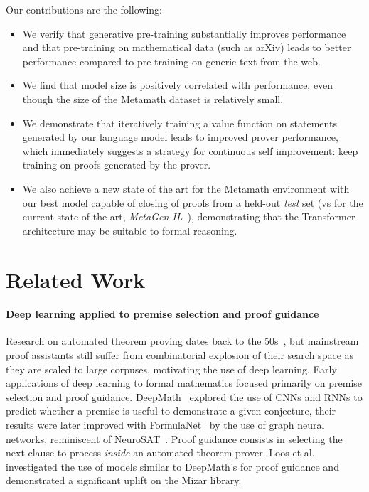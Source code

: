 \documentclass{article}
\begin{document}
Our contributions are the following:
\begin{itemize}

\item We verify that generative pre-training substantially improves performance and that pre-training on mathematical data (such as arXiv) leads to better performance compared to pre-training on generic text from the web. \item We find that model size is positively correlated with performance, even though the size  of the Metamath dataset is relatively small. \item We demonstrate that iteratively training a value function on statements generated by our language model leads to improved prover performance, which immediately suggests a strategy for continuous self improvement: keep training on proofs generated by the prover.
\item We also achieve a new state of the art for the Metamath environment with our best model capable of closing  of proofs from a held-out \textit{test} set (vs  for the current state of the art, \textit{MetaGen-IL}~\cite{wang2020learning}), demonstrating that the Transformer architecture may be suitable to formal reasoning.
\end{itemize}

\section{Related Work}

\paragraph{Deep learning applied to premise selection and proof guidance} Research on automated theorem proving dates back to the 50s~\cite{harrison2014history}, but mainstream proof assistants still suffer from combinatorial explosion of their search space as they are scaled to large corpuses, motivating the use of deep learning. Early applications of deep learning to formal mathematics focused primarily on premise selection and proof guidance. DeepMath~\cite{irving2016deepmath} explored the use of CNNs and RNNs to predict whether a premise is useful to demonstrate a given conjecture, their results were later improved with FormulaNet~\cite{wang2017premise} by the use of graph neural networks, reminiscent of NeuroSAT~\cite{selsam2018learning}. Proof guidance consists in selecting the next clause to process \textit{inside} an automated theorem prover. Loos et al.~\cite{loos2017deep} investigated the use of models similar to DeepMath's for proof guidance and demonstrated a significant uplift on the Mizar library.
\end{document}
